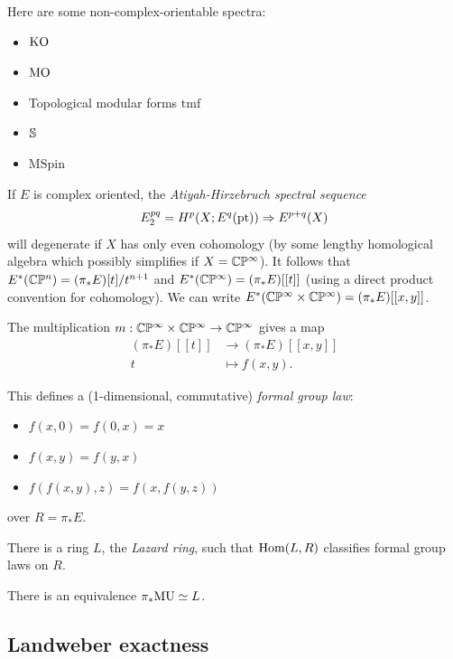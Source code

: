 \documentclass{article}
\begin{document}
\begin{ex}
	Here are some non-complex-orientable spectra:
	\begin{itemize}
		\item $\mathrm{KO}$
		\item $\mathrm{MO}$
    \item Topological modular forms $\mathrm{tmf}$
		\item $\mathbb{S}$
    \item $\mathrm{MSpin}$
	\end{itemize}
\end{ex}

If $E$ is complex oriented, the \emph{Atiyah-Hirzebruch spectral sequence}
\[
	E^{pq}_2 = H^p(X; E^q(\mathrm{pt})) \Rightarrow E^{p+q}(X)
\]
will degenerate if $X$ has only even cohomology (by some lengthy homological algebra which possibly simplifies if $X = \mathbb{C}\mathbb{P}^\infty$).
It follows that $E^*(\mathbb{C}\mathbb{P}^n) = (\pi_* E)[t] / t^{n+1}$ and $E^*(\mathbb{C}\mathbb{P}^\infty) = (\pi_* E)[[t]]$ (using a direct product convention for cohomology).
We can write $E^*(\mathbb{C}\mathbb{P}^\infty \times \mathbb{C}\mathbb{P}^\infty) = (\pi_* E)[[x, y]]$.

The multiplication $m: \mathbb{C}\mathbb{P}^\infty \times \mathbb{C}\mathbb{P}^\infty \to \mathbb{C}\mathbb{P}^\infty$ gives a map
\begin{align*}
	(\pi_* E)[[t]] &\to (\pi_* E)[[x, y]] \\
	t &\mapsto f(x, y).
\end{align*}

This defines a (1-dimensional, commutative) \emph{formal group law}:
\begin{itemize}
	\item $f(x, 0) = f(0, x) = x$
	\item $f(x, y) = f(y, x)$
	\item $f(f(x, y), z) = f(x, f(y, z))$
\end{itemize}
over $R = \pi_* E$.

\begin{prop}
	There is a ring $L$, the \emph{Lazard ring}, such that $\operatorname{Hom}(L, R)$ classifies formal group laws on $R$.
\end{prop}

\begin{thm}
	There is an equivalence $\pi_* \mathrm{MU} \simeq L$.
\end{thm}

\subsection{Landweber exactness}
\end{document}
